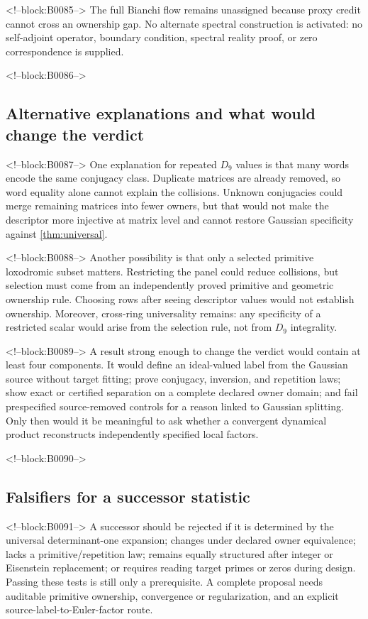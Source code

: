 \documentclass[11pt,a4paper]{article}
\theoremstyle{definition}
\theoremstyle{remark}
\begin{document}
<!--block:B0085-->
The full Bianchi flow remains unassigned because proxy credit cannot cross an ownership gap. No alternate spectral construction is activated: no self-adjoint operator, boundary condition, spectral reality proof, or zero correspondence is supplied.

<!--block:B0086-->
\subsection{Alternative explanations and what would change the verdict}

<!--block:B0087-->
One explanation for repeated \(D_9\) values is that many words encode the same conjugacy class. Duplicate matrices are already removed, so word equality alone cannot explain the collisions. Unknown conjugacies could merge remaining matrices into fewer owners, but that would not make the descriptor more injective at matrix level and cannot restore Gaussian specificity against \cref{thm:universal}.

<!--block:B0088-->
Another possibility is that only a selected primitive loxodromic subset matters. Restricting the panel could reduce collisions, but selection must come from an independently proved primitive and geometric ownership rule. Choosing rows after seeing descriptor values would not establish ownership. Moreover, cross-ring universality remains: any specificity of a restricted scalar would arise from the selection rule, not from \(D_9\) integrality.

<!--block:B0089-->
A result strong enough to change the verdict would contain at least four components. It would define an ideal-valued label from the Gaussian source without target fitting; prove conjugacy, inversion, and repetition laws; show exact or certified separation on a complete declared owner domain; and fail prespecified source-removed controls for a reason linked to Gaussian splitting. Only then would it be meaningful to ask whether a convergent dynamical product reconstructs independently specified local factors.

<!--block:B0090-->
\subsection{Falsifiers for a successor statistic}

<!--block:B0091-->
A successor should be rejected if it is determined by the universal determinant-one expansion; changes under declared owner equivalence; lacks a primitive/repetition law; remains equally structured after integer or Eisenstein replacement; or requires reading target primes or zeros during design. Passing these tests is still only a prerequisite. A complete proposal needs auditable primitive ownership, convergence or regularization, and an explicit source-label-to-Euler-factor route.
\end{document}
